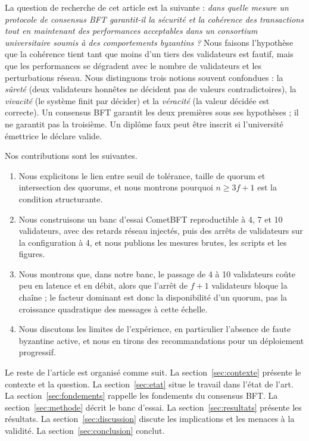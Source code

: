 \documentclass[conference]{IEEEtran}
\begin{document}
La question de recherche de cet article est la suivante : \emph{dans quelle mesure un protocole de consensus BFT garantit-il la sécurité et la cohérence des transactions tout en maintenant des performances acceptables dans un consortium universitaire soumis à des comportements byzantins ?} Nous faisons l'hypothèse que la cohérence tient tant que moins d'un tiers des validateurs est fautif, mais que les performances se dégradent avec le nombre de validateurs et les perturbations réseau. Nous distinguons trois notions souvent confondues : la \emph{sûreté} (deux validateurs honnêtes ne décident pas de valeurs contradictoires), la \emph{vivacité} (le système finit par décider) et la \emph{véracité} (la valeur décidée est correcte). Un consensus BFT garantit les deux premières sous ses hypothèses ; il ne garantit pas la troisième. Un diplôme faux peut être inscrit si l'université émettrice le déclare valide.

Nos contributions sont les suivantes.

\begin{enumerate}
\item Nous explicitons le lien entre seuil de tolérance, taille de quorum et intersection des quorums, et nous montrons pourquoi $n \geq 3f+1$ est la condition structurante.
\item Nous construisons un banc d'essai CometBFT reproductible à 4, 7 et 10 validateurs, avec des retards réseau injectés, puis des arrêts de validateurs sur la configuration à 4, et nous publions les mesures brutes, les scripts et les figures.
\item Nous montrons que, dans notre banc, le passage de 4 à 10 validateurs coûte peu en latence et en débit, alors que l'arrêt de $f+1$ validateurs bloque la chaîne ; le facteur dominant est donc la disponibilité d'un quorum, pas la croissance quadratique des messages à cette échelle.
\item Nous discutons les limites de l'expérience, en particulier l'absence de faute byzantine active, et nous en tirons des recommandations pour un déploiement progressif.
\end{enumerate}

Le reste de l'article est organisé comme suit. La section~\ref{sec:contexte} présente le contexte et la question. La section~\ref{sec:etat} situe le travail dans l'état de l'art. La section~\ref{sec:fondements} rappelle les fondements du consensus BFT. La section~\ref{sec:methode} décrit le banc d'essai. La section~\ref{sec:resultats} présente les résultats. La section~\ref{sec:discussion} discute les implications et les menaces à la validité. La section~\ref{sec:conclusion} conclut.
\end{document}
